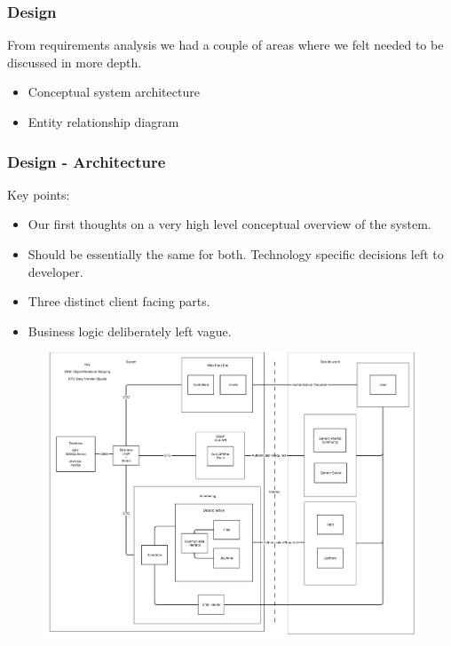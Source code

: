 \documentclass[10pt, compress]{beamer}
\begin{document}

\begin{frame}[fragile]
  \frametitle{Design}
  
   \small{ 
   	
   		From requirements analysis we had a couple of areas where we felt needed to be discussed in more depth.
   		
   		\begin{itemize}
			\item Conceptual system architecture
   			\item Entity relationship diagram
   		\end{itemize}
     
   }

\end{frame}

\begin{frame}[fragile]
  \frametitle{Design - Architecture}
  
   \small{
   	 Key points:

     \begin{itemize}
     	\item Our first thoughts on a very high level conceptual overview of the system.
   		\item Should be essentially the same for both. Technology specific decisions left to developer.
   		\item Three distinct client facing parts.
   		\item Business logic deliberately left vague.
   	  \end{itemize}
   	  
   	  \begin{figure}
	  \begin{center}
      \includegraphics[width=1.0\textwidth]{../design/system/groupproject_systemarchitecture.png}
	  \end{center}
	  \end{figure}
   }

\end{frame}
\end{document}
